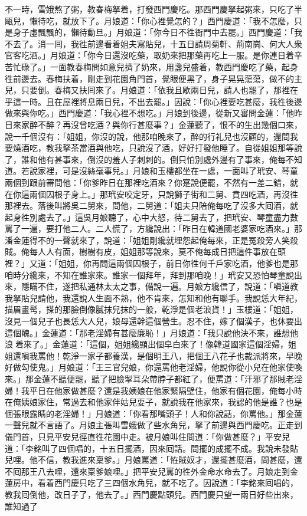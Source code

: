 不一時，雪娥熬了粥，教春梅拏着，打發西門慶吃。那西門慶拏起粥來，只吃了半甌兒，懶待吃，就放下了。月娘道：「你心裡覺怎的？」西門慶道：「我不怎麼，只是身子虛飄飄的，懶待動旦。」{}月娘道：「你今日不徃衙門中去罷。」西門慶道：「我不去了。消一囘，我徃前邊看着姐夫寫貼兒，十五日請周菊軒、荊南崗、何大人衆官客吃酒。」月娘道：「你今日還沒吃藥，取奶來把那藥再吃上一服。是你連日着辛苦忙碌了。」一面教春梅問如意兒擠了奶來，用盞兒盛着，教西門慶吃了藥，起身徃前邊去。春梅扶着，剛走到花園角門首，覺眼便黑了，身子晃晃蕩蕩，做不的主兒，只要倒。春梅又扶囘來了。月娘道：「依我且歇兩日兒，請人也罷了，那裡在乎這一時。且在屋裡將息兩日兒，不出去罷。」因說：「你心裡要吃甚麼，我徃後邊做來與你吃。」西門慶道：「我心裡不想吃。」月娘到後邊，從新又審問金蓮：「他昨日來家醉不醉？再沒曾吃酒？與你行甚麼事？」金蓮聽了，恨不的生出幾個口來，說一千個沒有：「姐姐，你沒的說，他那咱晚來了，醉的行礼兒也沒顧的，還問我要燒酒吃，教我拏茶當酒與他吃，只說沒了酒，好好打發他睡了。自從姐姐那等說了，誰和他有甚事來，倒沒的羞人子剌剌的。倒只怕別處外邊有了事來，俺每不知道。若說家裡，可是沒絲毫事兒。」{}月娘和玉樓都坐在一處，一面叫了玳安、琴童兩個到跟前審問他：「你爹昨日在那裡吃酒來？你寔說便罷，不然有一差二錯，就在你這兩個囚根子身上。」那玳安咬定牙，只說獅子街和二舅、賁四吃酒，再沒徃那裡去。{}落後叫將吳二舅來，問他，二舅道：「姐夫只陪俺每吃了沒多大囘酒，就起身徃別處去了。」這吳月娘聽了，心中大怒，待二舅去了，把玳安、琴童盡力數罵了一遍，要打他二人。二人慌了，方纔說出：「昨日在韓道國老婆家吃酒來。」那潘金蓮得不的一聲就來了，說道：「姐姐剛纔就埋怨起俺每來，正是冤殺旁人笑殺賊。俺每人人有面，樹樹有皮，姐姐那等說來，莫不俺每成日把這件事放在頭裡？」{}又道：「姐姐，你再問這兩個囚根子，前日你徃何千戶家吃酒，他爹也是那咱時分纔來，不知在誰家來。誰家一個拜年，拜到那咱晚！」玳安又恐怕琴童說出來，隱瞞不住，遂把私通林太太之事，備說一遍。月娘方纔信了，說道：「嗔道教我拏貼兒請他，我還說人生面不熟，他不肯來，怎知和他有聯手。我說恁大年紀，描眉畫髩，搽的那臉倒像膩抹兒抹的一般，乾淨是個老浪貨！」玉樓道：「姐姐，沒見一個兒子也長恁大人兒，娘母還幹這個營生。忍不住，嫁了個漢子，也休要出這個醜。」金蓮道：「那老淫婦有甚麼廉恥！」月娘道：「我只說他決不來，誰想他浪𢵞着來了。」金蓮道：「這個，姐姐纔顯出個皁白來了！像韓道國家這個淫婦，姐姐還嗔我罵他！乾淨一家子都養漢，是個明王八，把個王八花子也裁派將來，早晚好做勾使鬼。」月娘道：「王三官兒娘，你還罵他老淫婦，他說你從小兒在他家使喚來。」{}那金蓮不聽便罷，聽了把臉掣耳朵帶脖子都紅了，{}{}便罵道：「汗邪了那賊老淫婦！我平日在他家做甚麼？還是我姨娘在他家緊隔壁住，他家有個花園，俺每小時在俺姨娘家住，常過去和他家伴姑兒耍子，就說我在他家來，我認的他是誰？也是個張眼露睛的老淫婦！」月娘道：「你看那嘴頭子！人和你說話，你罵他。」那金蓮一聲兒就不言語了。月娘主張叫雪娥做了些水角兒，拏了前邊與西門慶吃。正走到儀門首，只見平安兒徑直徃花園中走。被月娘叫住問道：「你做甚麼？」平安兒道：「李銘叫了四個唱的，十五日擺酒，因來囘話。問擺的成擺不成。我說未發貼兒哩。他不信，教我進來稟爹。」月娘罵道：「恠賊奴才，還擺甚麼酒，問甚麼，還不囘那王八去哩，還來稟爹娘哩。」把平安兒罵的徃外金命水命去了。月娘走到金蓮房中，看着西門慶只吃了三四個水角兒，就不吃了。因說道：「李銘來囘唱的，教我囘倒他，改日子了，他去了。」西門慶點頭兒。西門慶只望一兩日好些出來，誰知過了
